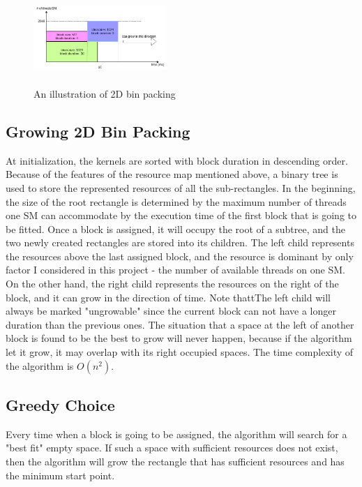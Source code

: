 \documentclass[conference]{IEEEtran}
\begin{document}
\begin{figure}[h]
   \centering
   \includegraphics[width=0.45\textwidth, height=100pt]{figs/timeline_policy2.png}
   \caption{An illustration of 2D bin packing}
   \label{fig:policy}
\end{figure}

\subsection{Growing 2D Bin Packing}
At initialization, the kernels are sorted with block duration in descending order. Because of the features of the resource map mentioned above, a binary tree is used to store the represented resources of all the sub-rectangles. In the beginning, the size of the root rectangle is determined by the maximum number of threads one SM can accommodate by the execution time of the first block that is going to be fitted. Once a block is assigned, it will occupy the root of a subtree, and the two newly created rectangles are stored into its children. The left child represents the resources above the last assigned block, and the resource is dominant by only factor I considered in this project - the number of available threads on one SM. On the other hand, the right child represents the resources on the right of the block, and it can grow in the direction of time. Note thattThe left child will always be marked "ungrowable" since the current block can not have a longer duration than the previous ones. The situation that a space at the left of another block is found to be the best to grow will never happen, because if the algorithm let it grow, it may overlap with its right occupied spaces. The time complexity of the algorithm is $O(n^2)$.\par


\subsection{Greedy Choice}
Every time when a block is going to be assigned, the algorithm will search for a "best fit" empty space. If such a space with sufficient resources does not exist, then the algorithm will grow the rectangle that has sufficient resources and has the minimum start point.\par
\end{document}
